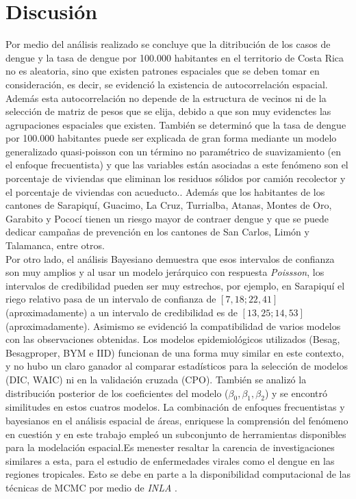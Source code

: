 \documentclass[a4paper,12pt]{report}
\begin{document}
\section*{Discusión}
Por medio del análisis realizado se concluye que la ditribución de los casos de dengue y la tasa de dengue por 100.000 habitantes en el territorio de Costa Rica no es aleatoria, sino que existen patrones espaciales que se deben tomar en consideración, es decir, se evidenció la existencia de autocorrelación espacial. Además esta autocorrelación no depende de la estructura de vecinos ni de la selección de matriz de pesos que se elija, debido a que son muy evidenctes las agrupaciones espaciales que existen. También se determinó que la tasa de dengue por 100.000 habitantes puede ser explicada de gran forma mediante un modelo generalizado quasi-poisson con un término no paramétrico de suavizamiento (en el enfoque frecuentista) y que las variables están asociadas a este fenómeno son el porcentaje de viviendas que eliminan los residuos sólidos por camión recolector y el porcentaje de viviendas con acueducto.. Además que los habitantes de los cantones de Sarapiquí, Guacimo, La Cruz, Turrialba, Atanas, Montes de Oro, Garabito y Pococí tienen un riesgo mayor de contraer dengue y que se puede dedicar campañas de prevención en los cantones de San Carlos, Limón y Talamanca, entre otros. \\
Por otro lado, el análisis Bayesiano demuestra que esos intervalos de confianza son muy amplios y al usar un modelo jerárquico con respuesta \textit{Poissson}, los intervalos de credibilidad pueden ser muy estrechos, por ejemplo, en Sarapiquí el riego relativo pasa de un intervalo de confianza de $[7,18; 22,41]$ (aproximadamente) a un intervalo de credibilidad es de $[13,25; 14,53]$ (aproximadamente). Asimismo se evidenció la compatibilidad de varios modelos con las observaciones obtenidas. Los modelos epidemiológicos utilizados (Besag, Besagproper, BYM e IID) funcionan de una forma muy similar en este contexto, y no hubo un claro ganador al comparar estadísticos para la selección de modelos (DIC, WAIC) ni en la validación cruzada (CPO). También se analizó la distribución posterior de los coeficientes del modelo ($\beta_0,\beta_1,\beta_2$) y se encontró similitudes en estos cuatros modelos. La combinación de enfoques frecuentistas y bayesianos en el análisis espacial de áreas, enriquese la comprensión del fenómeno en cuestión y en este trabajo empleó un subconjunto de herramientas disponibles para la modelación espacial.Es menester resaltar la carencia de investigaciones similares a esta, para el estudio de enfermedades virales como el dengue en las regiones tropicales. Esto se debe en parte a la disponibilidad computacional de las técnicas de MCMC por medio de \textit{INLA} .
\newpage


\end{document}
